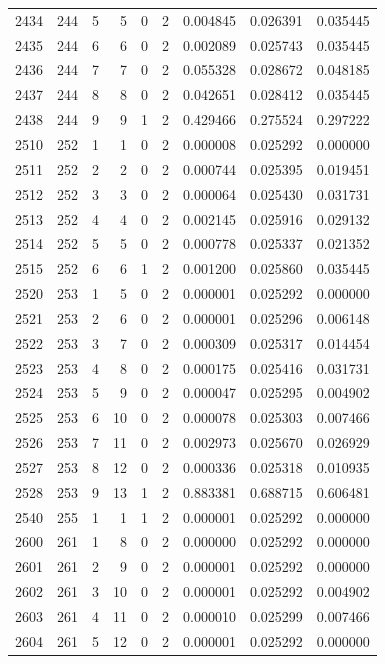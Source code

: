 \begin{longtable}{rrrrrrrrr}
2434 & 244 & 5 & 5 & 0 & 2 & 0.004845 & 0.026391 & 0.035445 \\
2435 & 244 & 6 & 6 & 0 & 2 & 0.002089 & 0.025743 & 0.035445 \\
2436 & 244 & 7 & 7 & 0 & 2 & 0.055328 & 0.028672 & 0.048185 \\
2437 & 244 & 8 & 8 & 0 & 2 & 0.042651 & 0.028412 & 0.035445 \\
2438 & 244 & 9 & 9 & 1 & 2 & 0.429466 & 0.275524 & 0.297222 \\
2510 & 252 & 1 & 1 & 0 & 2 & 0.000008 & 0.025292 & 0.000000 \\
2511 & 252 & 2 & 2 & 0 & 2 & 0.000744 & 0.025395 & 0.019451 \\
2512 & 252 & 3 & 3 & 0 & 2 & 0.000064 & 0.025430 & 0.031731 \\
2513 & 252 & 4 & 4 & 0 & 2 & 0.002145 & 0.025916 & 0.029132 \\
2514 & 252 & 5 & 5 & 0 & 2 & 0.000778 & 0.025337 & 0.021352 \\
2515 & 252 & 6 & 6 & 1 & 2 & 0.001200 & 0.025860 & 0.035445 \\
2520 & 253 & 1 & 5 & 0 & 2 & 0.000001 & 0.025292 & 0.000000 \\
2521 & 253 & 2 & 6 & 0 & 2 & 0.000001 & 0.025296 & 0.006148 \\
2522 & 253 & 3 & 7 & 0 & 2 & 0.000309 & 0.025317 & 0.014454 \\
2523 & 253 & 4 & 8 & 0 & 2 & 0.000175 & 0.025416 & 0.031731 \\
2524 & 253 & 5 & 9 & 0 & 2 & 0.000047 & 0.025295 & 0.004902 \\
2525 & 253 & 6 & 10 & 0 & 2 & 0.000078 & 0.025303 & 0.007466 \\
2526 & 253 & 7 & 11 & 0 & 2 & 0.002973 & 0.025670 & 0.026929 \\
2527 & 253 & 8 & 12 & 0 & 2 & 0.000336 & 0.025318 & 0.010935 \\
2528 & 253 & 9 & 13 & 1 & 2 & 0.883381 & 0.688715 & 0.606481 \\
2540 & 255 & 1 & 1 & 1 & 2 & 0.000001 & 0.025292 & 0.000000 \\
2600 & 261 & 1 & 8 & 0 & 2 & 0.000000 & 0.025292 & 0.000000 \\
2601 & 261 & 2 & 9 & 0 & 2 & 0.000001 & 0.025292 & 0.000000 \\
2602 & 261 & 3 & 10 & 0 & 2 & 0.000001 & 0.025292 & 0.004902 \\
2603 & 261 & 4 & 11 & 0 & 2 & 0.000010 & 0.025299 & 0.007466 \\
2604 & 261 & 5 & 12 & 0 & 2 & 0.000001 & 0.025292 & 0.000000 \\

\end{longtable}
